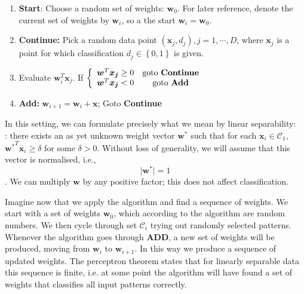\begin{enumerate}
\item {\bf Start}: Choose a random set of  weights: $\boldsymbol{w}_0$. For later reference, denote the current set of weights by $\boldsymbol{w}_i$, so a the start
  $\boldsymbol{w}_i = \boldsymbol{w}_0$.
  
\item {\bf Continue: } Pick a random data point $(\boldsymbol{x}_j, d_j), j = 1, \cdots, D$, where $\boldsymbol{x}_j$ is a point for which
  classification $d_j \in \left\{ 0, 1 \right\}$  is given.

\item Evaluate $\boldsymbol{w}^T_i \boldsymbol{x}_j$.  If $\left\{ \begin{array}{lcl} \boldsymbol{w}^T \boldsymbol{x_j} \ge 0 &  \mbox{goto {\bf Continue}}\\
  \boldsymbol{w}^T \boldsymbol{x_j} <0 & \mbox{goto {\bf Add}}  \end{array} \right.$

\item {\bf Add: } $\boldsymbol{w}_{i+1} = \boldsymbol{w}_i + \boldsymbol{x}$; Goto {\bf Continue}

\end{enumerate}
In this setting, we can formulate precisely what we mean by linear separability: \\
: there exists an as yet unknown weight vector $\boldsymbol{w}^*$ such that for each $\boldsymbol{x}_i \in \mathcal{C}_1$,
${\boldsymbol{w}^*}^T \boldsymbol{x}_i \ge \delta$ for some $\delta >0$. Without loss of generality, we will assume that this vector is normalised, i.e.,
$$
\mid \boldsymbol{w}^* \mid = 1
$$.
We can multiply $\boldsymbol{w}$ by any positive factor; this does not affect classification.

 Imagine now that we apply the algorithm and find a sequence of weights. We start with a set of weights $\boldsymbol{w}_0$, which according to the algorithm
are random numbers. We then cycle through set $\mathcal{C}_i$ trying out randomly selected patterns. Whenever the algorithm goes through {\bf ADD}, a new set
of weights will be produced, moving from $\boldsymbol{w}_i$ to $\boldsymbol{w}_{i+1}$. In this way we produce a sequence of updated weights. The perceptron
theorem states that for linearly separable data this sequence is finite, i.e. at some point the algorithm will have found a set of weights that classifies
all input patterns correctly.

